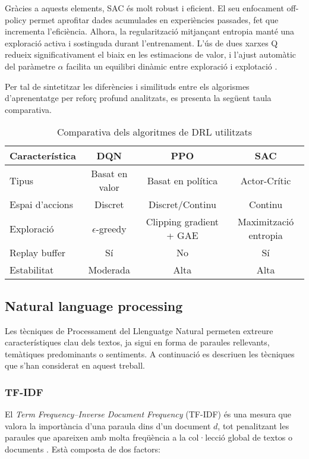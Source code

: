 \documentclass[12pt,a4paper,twoside]{book}
\begin{document}
Gràcies a aquests elements, SAC és molt robust i eficient. El seu enfocament off-policy permet aprofitar dades acumulades en experiències passades, fet que incrementa l'eficiència. Alhora, la regularització mitjançant entropia manté una exploració activa i sostinguda durant l'entrenament. L'ús de dues xarxes Q redueix significativament el biaix en les estimacions de valor, i l'ajust automàtic del paràmetre $\alpha$ facilita un equilibri dinàmic entre exploració i explotació \cite{Haarnoja2018}.

\vspace{2em}

Per tal de sintetitzar les diferències i similituds entre els algorismes d'aprenentatge per reforç profund analitzats, es presenta la següent taula comparativa.
\begin{table}[h]
\centering
\caption{Comparativa dels algoritmes de DRL utilitzats}
\begin{tabular}{lccc}
\hline
\textbf{Característica} & \textbf{DQN} & \textbf{PPO} & \textbf{SAC} \\ \hline
Tipus & Basat en valor & Basat en política & Actor-Crític \\
Espai d'accions & Discret & Discret/Continu & Continu \\
Exploració & $\epsilon$-greedy & Clipping gradient + GAE & Maximització entropia \\
Replay buffer & Sí & No & Sí \\
Estabilitat & Moderada & Alta & Alta \\ \hline
\end{tabular}
\label{tab:comparativa_algoritmes}
\end{table}



\subsection{Natural language processing}

 Les tècniques de Processament del Llenguatge Natural permeten extreure característiques clau dels textos, ja sigui en forma de paraules rellevants, temàtiques predominants o sentiments. A continuació es descriuen les tècniques que s'han considerat en aquest treball.

\subsubsection{TF-IDF}

El \emph{Term Frequency–Inverse Document Frequency} (TF-IDF) és una mesura que valora la importància d'una paraula dins d'un document $d$, tot penalitzant les paraules que apareixen amb molta freqüència a la col·lecció global de textos o documents \cite{Ramos2003}. Està composta de dos factors:
\end{document}
